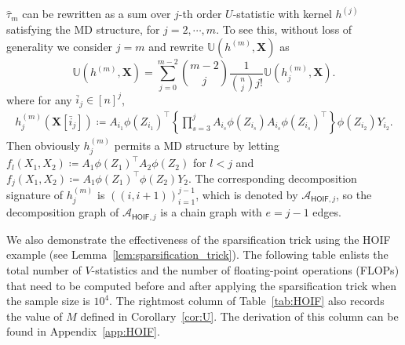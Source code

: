 \documentclass[twoside,11pt]{article}
\newcommand{\libref}[2]{\href{#2}{\texttt{#1}}}
\newcommand{\ustat}{\mathbb{U}}
\newcommand{\ustatp}[2]{\ustat(#1,#2)}
\newcommand{\less}{O}
\def\calA{\mathcal{A}}
\newcommand{\opteinsum}{\libref{opt-einsum}{https://dgasmith.github.io/opt_einsum/}}
\begin{document}
$\hat{\tau}_{m}$ can be rewritten as a sum over $j$-th order $U$-statistic with kernel $h^{(j)}$ satisfying the MD structure, for $j = 2, \cdots, m$. To see this, without loss of generality we consider $j = m$ and rewrite $\ustat (h^{(m)}, \bm{X})$ as
\begin{equation*}
\ustatp{h^{(m)}}{\bm{X}} = \sum_{j=0}^{m-2} \binom{m-2}{j} \frac{1}{\binom{n}{j} j!}  \ustatp{h_j^{(m)}}{\bm{X}}.
\end{equation*}
where for any $\bar{i}_{j} \in [n]^j$, 
\begin{align} 
\label{eq:hoif_kernel}
h_j^{(m)} (\bm{X}[\bar{i}_{j}]) \coloneqq A_{i_1} \phi (Z_{i_1})^{\top} \left\{ \prod_{s = 3}^{j} A_{i_s} \phi (Z_{i_s}) A_{i_s} \phi (Z_{i_s})^{\top} \right\} \phi (Z_{i_2}) Y_{i_2}.
\end{align}
Then obviously $h_j^{(m)}$ permits a MD structure by letting $f_{l} (X_1, X_2) \coloneqq A_1 \phi (Z_1)^{\top} A_2 \phi (Z_2)$ for $l < j$ and $f_{j} (X_1, X_2) \coloneqq A_1 \phi (Z_1)^{\top} \phi (Z_2) Y_2 $. The corresponding decomposition signature of $h_j^{(m)}$ is $((i, i+1))_{i=1}^{j-1}$, which is denoted by $\calA_{\mathsf{HOIF},j}$, so the decomposition graph of $\calA_{\mathsf{HOIF},j}$ is a chain graph with $e = j - 1$ edges.

We also demonstrate the effectiveness of the sparsification trick using the HOIF example (see Lemma~\ref{lem:sparsification_trick}). The following table enlists the total number of $V$-statistics and the number of floating-point operations (FLOPs) that need to be computed before and after applying the sparsification trick when the sample size is $10^4$. The rightmost column of Table~\ref{tab:HOIF} also records the value of $M$ defined in Corollary~\ref{cor:U}. The derivation of this column can be found in Appendix~\ref{app:HOIF}. 

\end{document}

